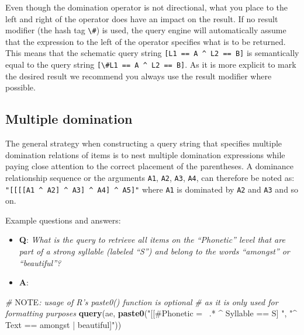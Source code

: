 \documentclass[]{book}
\newenvironment{Shaded}{\begin{snugshade}}{\end{snugshade}}
\newcommand{\AlertTok}[1]{\textcolor[rgb]{0.94,0.16,0.16}{#1}}
\newcommand{\CommentTok}[1]{\textcolor[rgb]{0.56,0.35,0.01}{\textit{#1}}}
\newcommand{\KeywordTok}[1]{\textcolor[rgb]{0.13,0.29,0.53}{\textbf{#1}}}
\newcommand{\NormalTok}[1]{#1}
\newcommand{\StringTok}[1]{\textcolor[rgb]{0.31,0.60,0.02}{#1}}
\providecommand{\tightlist}{%
  \setlength{\itemsep}{0pt}\setlength{\parskip}{0pt}}
\theoremstyle{definition}
\theoremstyle{definition}
\theoremstyle{definition}
\theoremstyle{remark}
\begin{document}
Even though the domination operator is not directional, what you place
to the left and right of the operator does have an impact on the result.
If no result modifier (the hash tag \texttt{\textbackslash{}\#}) is
used, the query engine will automatically assume that the expression to
the left of the operator specifies what is to be returned. This means
that the schematic query string
\texttt{{[}L1\ ==\ A\ \^{}\ L2\ ==\ B{]}} is semantically equal to the
query string
\texttt{{[}\textbackslash{}\#L1\ ==\ A\ \^{}\ L2\ ==\ B{]}}. As it is
more explicit to mark the desired result we recommend you always use the
result modifier where possible.

\hypertarget{multiple-domination}{%
\subsection{Multiple domination}\label{multiple-domination}}

The general strategy when constructing a query string that specifies
multiple domination relations of items is to nest multiple domination
expressions while paying close attention to the correct placement of the
parentheses. A dominance relationship sequence or the arguments
\texttt{A1}, \texttt{A2}, \texttt{A3}, \texttt{A4}, can therefore be
noted as:
\texttt{"{[}{[}{[}{[}A1\ \^{}\ A2{]}\ \^{}\ A3{]}\ \^{}\ A4{]}\ \^{}\ A5{]}"}
where \texttt{A1} is dominated by \texttt{A2} and \texttt{A3} and so on.

Example questions and answers:

\begin{itemize}
\tightlist
\item
  \textbf{Q}: \emph{What is the query to retrieve all items on the
  ``Phonetic'' level that are part of a strong syllable (labeled ``S'')
  and belong to the words ``amongst'' or ``beautiful''?}
\item
  \textbf{A}:
\end{itemize}

\begin{Shaded}
\begin{Highlighting}[]
\CommentTok{# }\AlertTok{NOTE}\CommentTok{: usage of R's paste0() function is optional}
\CommentTok{# as it is only used for formatting purposes}
\KeywordTok{query}\NormalTok{(ae, }\KeywordTok{paste0}\NormalTok{(}\StringTok{"[[#Phonetic =~ .* ^ Syllable == S] "}\NormalTok{,}
                 \StringTok{"^ Text == amongst | beautiful]"}\NormalTok{))}
\end{Highlighting}
\end{Shaded}
\end{document}
